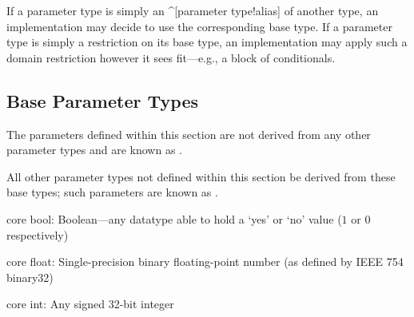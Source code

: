 \begin{ex}
  If a parameter type is simply an ^[parameter type!alias] of another type, an
  implementation may decide to use the corresponding base type. If a parameter
  type is simply a restriction on its base type, an implementation may apply
  such a domain restriction however it sees fit---e.g., a block of conditionals.
\end{ex}

\subsection{Base Parameter Types}
The parameters defined within this section are not derived from any other
parameter types and are known as .

All other parameter types not defined within this section \shall be derived from
these base types; such parameters are known as .

\begin{description}
  \typedef core bool:
  Boolean---any datatype able to hold a `yes' or `no' value ($1$ or $0$
  respectively)

  \typedef core float:
  Single-precision binary floating-point number (as defined by IEEE 754
  binary32)

  \typedef core int:
  Any signed 32-bit integer
\end{description}



